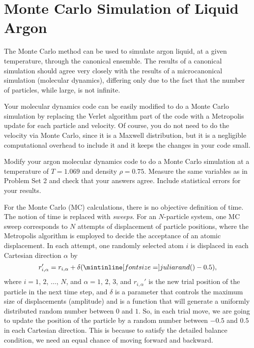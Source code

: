 \section{Monte Carlo Simulation of Liquid Argon}

The Monte Carlo method can be used to simulate argon liquid, at a given temperature, through
the canonical ensemble. The results of a canonical simulation should agree very closely with
the results of a microcanonical simulation (molecular dynamics), differing only due to the
fact that the number of particles, while large, is not infinite.

Your molecular dynamics code can be easily modified to do a Monte Carlo simulation by
replacing the Verlet algorithm part of the code with a Metropolis update for each particle
and velocity. Of course, you do not need to do the velocity via Monte Carlo, since it is a
Maxwell distribution, but it is a negligible computational overhead to include it and it
keeps the changes in your code small.

\Question{}
Modify your argon molecular dynamics code to do a Monte Carlo simulation at a temperature of
\(T = 1.069\) and density \(\rho = 0.75\). Measure the same variables as in Problem Set 2
and check that your answers agree. Include statistical errors for your results.

\Answer{}
For the Monte Carlo (MC) calculations, there is no objective definition of time. The notion
of time is replaced with \emph{sweeps}. For an \(N\)-particle system, one MC sweep
corresponds to \(N\) attempts of displacement of particle positions, where the Metropolis
algorithm is employed to decide the acceptance of an atomic displacement. In each attempt,
one randomly selected atom \(i\) is displaced in each Cartesian direction
\(\alpha\) by
%
\begin{equation}\label{eq:ri}
    r_{i, \alpha}' = r_{i, \alpha} + \delta (\code{rand()} - 0.5),
\end{equation}
%
where \(i = 1\), \(2\), \(\ldots\), \(N\), and \(\alpha = 1\), \(2\), \(3\),
and \(r_{i, \alpha}'\) is the new trial position of the particle in the next time step,
and \(\delta\) is a parameter that controls the maximum size of displacements (amplitude)
and  is a function that will generate a
uniformly distributed random number between \(0\) and \(1\).
So, in each trial move, we are going to update the position of the particle
by a random number between \(-0.5\) and \(0.5\) in each Cartesian direction.
This is because to satisfy the detailed balance condition, we need an equal chance
of moving forward and backward.

